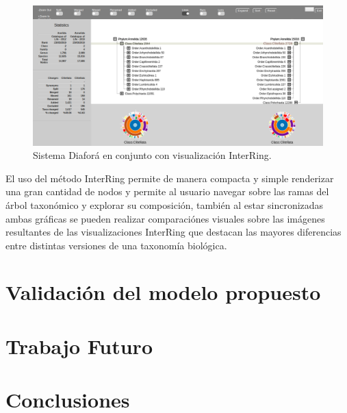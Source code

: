 \documentclass[journal]{IEEEtran}
\begin{document}
\begin{figure}[]
  \centering
  \includegraphics[scale=0.25]{extend_diafora.png}
  \caption{Sistema Diaforá en conjunto con visualización InterRing.}
  \label{}
\end{figure}

El uso del método InterRing permite de manera compacta y simple renderizar una gran cantidad de nodos y permite al usuario navegar sobre las ramas 
del árbol taxonómico y explorar su composición, también al estar sincronizadas ambas gráficas se pueden realizar comparaciónes 
visuales sobre las imágenes resultantes de las visualizaciones InterRing que destacan las mayores diferencias entre distintas versiones de una taxonomía biológica.
\section{Validación del modelo propuesto}

\section{Trabajo Futuro}


\section{Conclusiones}






\end{document}
